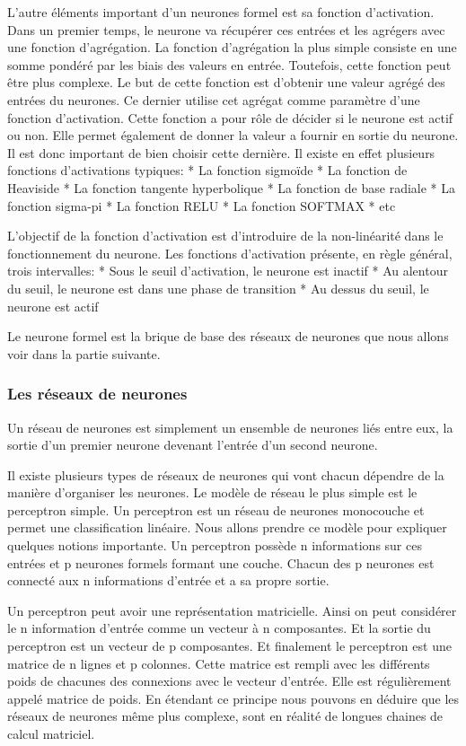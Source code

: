 \documentclass[a4paper,10pt,openany,oneside]{sphinxmanual}
\begin{document}
L'autre éléments important d'un neurones formel est sa fonction d'activation. Dans un premier temps, le neurone va récupérer ces entrées
et les agrégers avec une fonction d'agrégation. La fonction d'agrégation la plus simple consiste en une somme pondéré par les biais des
valeurs en entrée. Toutefois, cette fonction peut être plus complexe. Le but de cette fonction est d'obtenir une valeur agrégé des entrées
du neurones. Ce dernier utilise cet agrégat comme paramètre d'une fonction d'activation. Cette fonction a pour rôle de décider si le
neurone est actif ou non. Elle permet également de donner la valeur a fournir en sortie du neurone. Il est donc important de bien choisir
cette dernière. Il existe en effet plusieurs fonctions d'activations typiques:
* La fonction sigmoïde
* La fonction de Heaviside
* La fonction tangente hyperbolique
* La fonction de base radiale
* La fonction sigma-pi
* La fonction RELU
* La fonction SOFTMAX
* etc

L'objectif de la fonction d'activation est d'introduire de la non-linéarité dans le fonctionnement du neurone. Les fonctions d'activation
présente, en règle général, trois intervalles:
* Sous le seuil d'activation, le neurone est inactif
* Au alentour du seuil, le neurone est dans une phase de transition
* Au dessus du seuil, le neurone est actif

Le neurone formel est la brique de base des réseaux de neurones que nous allons voir dans la partie suivante.


\subsubsection{Les réseaux de neurones}
\label{index:les-reseaux-de-neurones}
Un réseau de neurones est simplement un ensemble de neurones liés entre eux, la sortie d'un premier neurone devenant l'entrée d'un second
neurone.

Il existe plusieurs types de réseaux de neurones qui vont chacun dépendre de la manière d'organiser les neurones. Le modèle de réseau le
plus simple est le perceptron simple. Un perceptron est un réseau de neurones monocouche et permet une classification linéaire.
Nous allons prendre ce modèle pour expliquer quelques notions importante. Un perceptron possède n informations sur ces
entrées et p neurones formels formant une couche. Chacun des p neurones est connecté aux n informations d'entrée et a sa propre sortie.

Un perceptron peut avoir une représentation matricielle. Ainsi on peut considérer le n information d'entrée comme un vecteur à n composantes.
Et la sortie du perceptron est un vecteur de p composantes. Et finalement le perceptron est une matrice de n lignes et p colonnes. Cette
matrice est rempli avec les différents poids de chacunes des connexions avec le vecteur d'entrée. Elle est régulièrement appelé matrice de
poids. En étendant ce principe nous pouvons en déduire que les réseaux de neurones même plus complexe, sont en réalité de longues chaines
de calcul matriciel.
\end{document}
